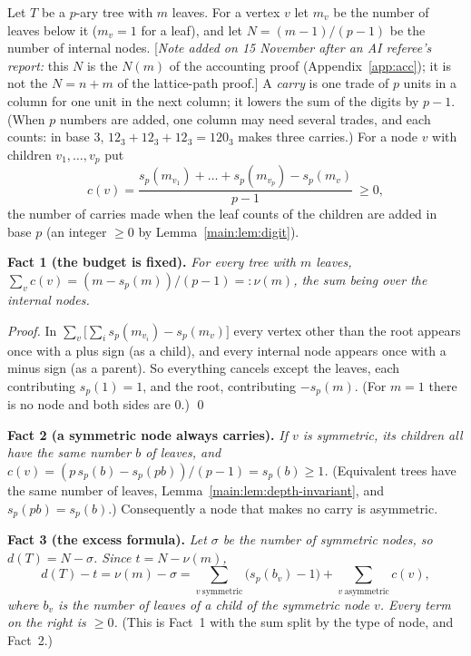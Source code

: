 \documentclass[11pt]{article}
\theoremstyle{definition}
\theoremstyle{remark}
\numberwithin{equation}{section}
\numberwithin{figure}{section}
\newcommand{\refnote}[1]{[\emph{Note added on 15 November after an AI referee's report:} #1]}
\begin{document}
Let $T$ be a $p$-ary tree with $m$ leaves. For a vertex $v$ let $m_v$ be the number of leaves below it
($m_v=1$ for a leaf), and let $N=(m-1)/(p-1)$ be the number of internal nodes.
\refnote{this $N$ is the $N(m)$ of the accounting proof (Appendix~\ref{app:acc}); it is not the $N=n+m$ of the
lattice-path proof.}
A \emph{carry} is one trade of
$p$ units in a column for one unit in the next column; it lowers the sum of the digits by $p-1$. (When $p$
numbers are added, one column may need several trades, and each counts: in base $3$, $12_3+12_3+12_3=120_3$
makes three carries.) For a node $v$ with children $v_1,\dots,v_p$ put
\[
 c(v)=\frac{s_p(m_{v_1})+\dots+s_p(m_{v_p})-s_p(m_v)}{p-1}\ \ge0 ,
\]
the number of carries made when the leaf counts of the children are added in base $p$ (an integer $\ge0$ by
Lemma~\ref{main:lem:digit}).

\medskip\noindent\textbf{Fact 1 (the budget is fixed).} \emph{For every tree with $m$ leaves,
$\sum_vc(v)=(m-s_p(m))/(p-1)=:\nu(m)$, the sum being over the internal nodes.}

\emph{Proof.} In $\sum_v\bigl[\sum_is_p(m_{v_i})-s_p(m_v)\bigr]$ every vertex other than the root appears once
with a plus sign (as a child), and every internal node appears once with a minus sign (as a parent). So
everything cancels except the leaves, each contributing $s_p(1)=1$, and the root, contributing $-s_p(m)$.
(For $m=1$ there is no node and both sides are $0$.) \qed

\medskip\noindent\textbf{Fact 2 (a symmetric node always carries).} \emph{If $v$ is symmetric, its children
all have the same number $b$ of leaves, and $c(v)=(p\,s_p(b)-s_p(pb))/(p-1)=s_p(b)\ge1$.} (Equivalent trees
have the same number of leaves, Lemma~\ref{main:lem:depth-invariant}, and $s_p(pb)=s_p(b)$.) Consequently a
node that makes no carry is asymmetric.

\medskip\noindent\textbf{Fact 3 (the excess formula).} \emph{Let $\sigma$ be the number of symmetric nodes, so
$d(T)=N-\sigma$. Since $t=N-\nu(m)$,}
\[
 d(T)-t=\nu(m)-\sigma=\sum_{v\ \mathrm{symmetric}}\bigl(s_p(b_v)-1\bigr)+\sum_{v\ \mathrm{asymmetric}}c(v),
\]
\emph{where $b_v$ is the number of leaves of a child of the symmetric node $v$. Every term on the right is
$\ge0$.} (This is Fact~1 with the sum split by the type of node, and Fact~2.)
\end{document}
